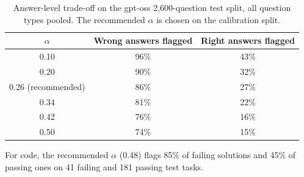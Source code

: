 \documentclass[11pt]{article}
\begin{document}
\begin{table}[h]
\centering
\small
\caption{Answer-level trade-off on the gpt-oss 2,600-question test split, all question types pooled. The recommended $\alpha$ is chosen on the calibration split.}
\label{tab:pareto}
\begin{tabular}{ccc}
\toprule
$\alpha$ & Wrong answers flagged & Right answers flagged \\
\midrule
0.10 & 96\% & 43\% \\
0.20 & 90\% & 32\% \\
0.26 (recommended) & 86\% & 27\% \\
0.34 & 81\% & 22\% \\
0.42 & 76\% & 16\% \\
0.50 & 74\% & 15\% \\
\bottomrule
\end{tabular}
\end{table}

For code, the recommended $\alpha$ (0.48) flags 85\% of failing solutions and 45\% of passing ones on 41 failing and 181 passing test tasks.
\end{document}
